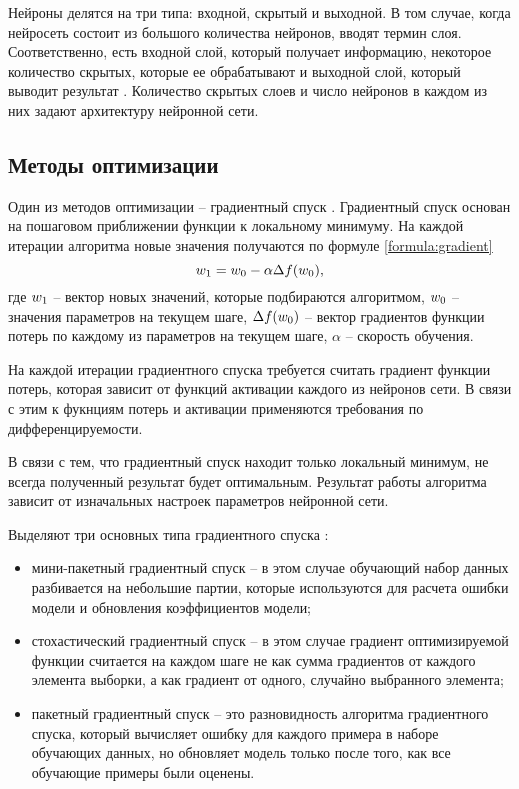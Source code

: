 Нейроны делятся на три типа: входной, скрытый и выходной. 
В том случае, когда нейросеть состоит из большого количества нейронов, вводят термин слоя. 
Соответственно, есть входной слой, который получает информацию, некоторое количество скрытых, которые ее обрабатывают и выходной слой, который выводит результат \cite{neuro_architecture}. 
Количество скрытых слоев и число нейронов в каждом из них задают архитектуру нейронной сети.

\subsection{Методы оптимизации}
Один из методов оптимизации -- градиентный спуск \cite{gradient}. 
Градиентный спуск основан на пошаговом приближении функции к локальному минимуму. 
На каждой итерации алгоритма новые значения получаются по формуле \ref{formula:gradient}
\begin{equation}\label{formula:gradient}
w_{\rm{1}} = w_{\rm{0}} - \alpha\Delta f(w_{\rm{0}}),
\end{equation}
где $w_{\rm{1}}$ -- вектор новых значений, которые подбираются алгоритмом, $w_{\rm{0}}$ -- значения параметров на текущем шаге, $\Delta f(w_{\rm{0}})$ -- вектор градиентов функции потерь по каждому из параметров на текущем шаге, $\alpha$ -- скорость обучения. 

На каждой итерации градиентного спуска требуется считать градиент функции потерь, которая зависит от функций активации каждого из нейронов сети. 
В связи с этим к фукнциям потерь и активации применяются требования по дифференцируемости.

В связи с тем, что градиентный спуск находит только локальный минимум, не всегда полученный результат будет оптимальным. 
Результат работы алгоритма зависит от изначальных настроек параметров нейронной сети.

Выделяют три основных типа градиентного спуска \cite{gradient}:
\begin{itemize}
	\item мини-пакетный градиентный спуск -- в этом случае обучающий набор данных разбивается на небольшие партии, которые используются для расчета ошибки модели и обновления коэффициентов модели;
	\item стохастический градиентный спуск -- в этом случае градиент оптимизируемой функции считается на каждом шаге не как сумма градиентов от каждого элемента выборки, а как градиент от одного, случайно выбранного элемента;
	\item пакетный градиентный спуск -- это разновидность
	алгоритма градиентного спуска, который вычисляет ошибку для	каждого примера в наборе обучающих данных, но обновляет модель только после того, как все обучающие примеры были оценены.
\end{itemize}

